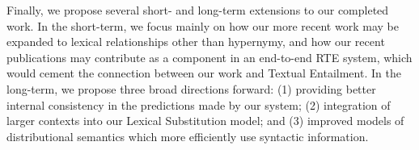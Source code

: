 Finally, we propose several short- and long-term extensions to our completed
work. In the short-term, we focus mainly on how our more recent work may be
expanded to lexical relationships other than hypernymy, and how our recent
publications may  contribute as a component in an end-to-end RTE system, which
would cement the connection between our work and Textual Entailment. In the
long-term, we propose three broad directions forward: (1) providing better
internal consistency in the predictions made by our system; (2) integration
of larger contexts into our Lexical Substitution model; and (3) improved
models of distributional semantics which more efficiently use syntactic
information.


